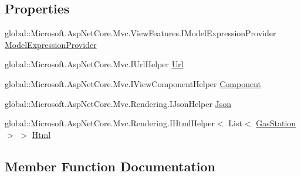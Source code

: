 \subsection*{Properties}
\begin{DoxyCompactItemize}
\item 
global\+::\+Microsoft.\+Asp\+Net\+Core.\+Mvc.\+View\+Features.\+I\+Model\+Expression\+Provider \mbox{\hyperlink{class_asp_net_core_1_1_views___home___all_stations_view_a2cb32aab11c9fff94e5ca9c1405add8a}{Model\+Expression\+Provider}}
\item 
global\+::\+Microsoft.\+Asp\+Net\+Core.\+Mvc.\+I\+Url\+Helper \mbox{\hyperlink{class_asp_net_core_1_1_views___home___all_stations_view_aebbf66ebceeab67770e0386feaebbe3e}{Url}}
\item 
global\+::\+Microsoft.\+Asp\+Net\+Core.\+Mvc.\+I\+View\+Component\+Helper \mbox{\hyperlink{class_asp_net_core_1_1_views___home___all_stations_view_aa0ec138c7d2b5652b89157bd26a92185}{Component}}
\item 
global\+::\+Microsoft.\+Asp\+Net\+Core.\+Mvc.\+Rendering.\+I\+Json\+Helper \mbox{\hyperlink{class_asp_net_core_1_1_views___home___all_stations_view_a440cb8eb6ce64b7657dfdeb4f69b827a}{Json}}
\item 
global\+::\+Microsoft.\+Asp\+Net\+Core.\+Mvc.\+Rendering.\+I\+Html\+Helper$<$ List$<$ \mbox{\hyperlink{class_gasoline_1_1_data_1_1_models_1_1_gas_station}{Gas\+Station}} $>$ $>$ \mbox{\hyperlink{class_asp_net_core_1_1_views___home___all_stations_view_a51ab38eddcf5b2aef5e28f0501032d7b}{Html}}
\end{DoxyCompactItemize}


\subsection{Member Function Documentation}
\mbox{\label{class_asp_net_core_1_1_views___home___all_stations_view_ab3f3345aead9b65284f82fb35baaa7a6}} 
